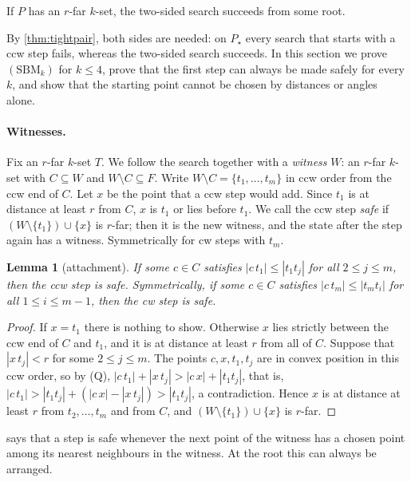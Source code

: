 \documentclass[11pt,a4paper]{article}
\newtheorem{lemma}[theorem]{Lemma}
\theoremstyle{definition}
\theoremstyle{remark}
\begin{document}
\begin{description}[leftmargin=3.2em,labelwidth=2.6em,itemsep=2pt]
\item[$(\mathrm{SBM}_k)$] If $P$ has an $r$-far $k$-set, the two-sided search
succeeds from some root.
\end{description}

\noindent By \cref{thm:tightpair}, both sides are needed: on $P_\star$ every
search that starts with a ccw step fails, whereas the two-sided search
succeeds. In this section we prove $(\mathrm{SBM}_k)$ for $k\le4$, prove that
the first step can always be made safely for every $k$, and show that the
starting point cannot be chosen by distances or angles alone.

\paragraph{Witnesses.}
Fix an $r$-far $k$-set $T$. We follow the search together with a
\emph{witness} $W$: an $r$-far $k$-set with $C\subseteq W$ and $W\setminus
C\subseteq F$. Write $W\setminus C=\{t_1,\dots,t_m\}$ in ccw order from the
ccw end of $C$. Let $x$ be the point that a ccw step would add. Since $t_1$ is
at distance at least $r$ from $C$, $x$ is $t_1$ or lies before $t_1$. We call
the ccw step \emph{safe} if $(W\setminus\{t_1\})\cup\{x\}$ is $r$-far; then it
is the new witness, and the state after the step again has a witness.
Symmetrically for cw steps with $t_m$.

\begin{lemma}[attachment]\label{lem:attach}
If some $c\in C$ satisfies $|c\,t_1|\le|t_1t_j|$ for all $2\le j\le m$, then
the ccw step is safe. Symmetrically, if some $c\in C$ satisfies
$|c\,t_m|\le|t_mt_i|$ for all $1\le i\le m-1$, then the cw step is safe.
\end{lemma}
\begin{proof}
If $x=t_1$ there is nothing to show. Otherwise $x$ lies strictly between the
ccw end of $C$ and $t_1$, and it is at distance at least $r$ from all of $C$.
Suppose that $|x\,t_j|<r$ for some $2\le j\le m$. The points $c,x,t_1,t_j$ are
in convex position in this ccw order, so by (Q),
$|c\,t_1|+|x\,t_j|>|c\,x|+|t_1t_j|$, that is,
$|c\,t_1|>|t_1t_j|+(|c\,x|-|x\,t_j|)>|t_1t_j|$, a contradiction. Hence $x$ is
at distance at least $r$ from $t_2,\dots,t_m$ and from $C$, and
$(W\setminus\{t_1\})\cup\{x\}$ is $r$-far.
\end{proof}

 says that a step is safe whenever the next point of the
witness has a chosen point among its nearest neighbours in the witness. At the
root this can always be arranged.
\end{document}
